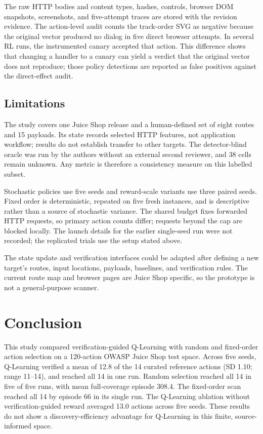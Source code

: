 \documentclass[conference, a4paper]{IEEEtran}
\begin{document}
The raw HTTP bodies and content types, hashes, controls, browser DOM
snapshots, screenshots, and five-attempt traces are stored with the
revision evidence. The action-level audit counts the track-order SVG
as negative because the original vector produced no dialog in five
direct browser attempts. In several RL runs, the instrumented canary
accepted that action. This difference shows that changing a handler
to a canary can yield a verdict that the original vector does not
reproduce; those policy detections are reported as false positives
against the direct-effect audit.

\subsection{Limitations}

The study covers one Juice Shop release and a human-defined set of
eight routes and 15 payloads. Its state records selected HTTP features,
not application workflow; results do not establish transfer to other
targets. The detector-blind oracle was run by the authors without an
external second reviewer, and 38 cells remain unknown. Any metric is
therefore a consistency measure on this labelled subset.

Stochastic policies use five seeds and reward-scale variants use three
paired seeds. Fixed order is deterministic, repeated on five fresh
instances, and is descriptive rather than a source of stochastic
variance. The shared budget fixes forwarded HTTP requests, so primary
action counts differ; requests beyond the cap are blocked locally.
The launch details for the earlier single-seed run were not recorded;
the replicated trials use the setup stated above.

The state update and verification interfaces could be adapted after
defining a new target's routes, input locations, payloads, baselines,
and verification rules. The current route map and browser pages are
Juice Shop specific, so the prototype is not a general-purpose scanner.

\section{Conclusion}

This study compared verification-guided Q-Learning with
random and fixed-order action selection on a 120-action
OWASP Juice Shop test space. Across five seeds, Q-Learning
verified a mean of 12.8 of the 14 curated reference actions
(SD 1.10; range 11--14), and reached all 14 in one run.
Random selection reached all 14 in five of five runs, with
mean full-coverage episode 308.4. The fixed-order scan reached
all 14 by episode 66 in its single run. The Q-Learning ablation
without verification-guided reward averaged 13.0 actions across
five seeds. These results do not show a discovery-efficiency
advantage for Q-Learning in this finite, source-informed space.
\end{document}
